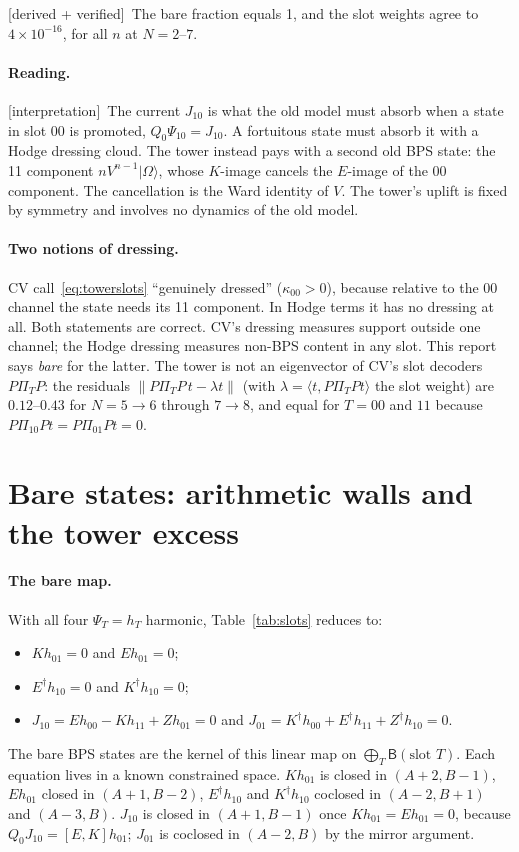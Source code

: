 \documentclass[11pt]{article}
\newcommand{\ip}[2]{\langle #1,#2\rangle}
\newcommand{\B}{\mathsf B}
\newcommand{\Om}{|\Omega\rangle}
\newcommand{\tagbox}[2]{\textsf{\small\color{#1}[#2]}}
\newcommand{\VER}{\tagbox{cder}{derived + verified}}
\newcommand{\INTERP}{\tagbox{cconj}{interpretation}}
\theoremstyle{plain}
\theoremstyle{remark}
\numberwithin{equation}{section}
\begin{document}
\VER\ The bare fraction equals 1, and the slot weights agree to $4\times10^{-16}$, for all $n$ at $N=2$--$7$.

\paragraph{Reading.} \INTERP\ The current $J_{10}$ is what the old model must absorb when a state in slot 00 is
promoted, $Q_0\Psi_{10}=J_{10}$. A fortuitous state must absorb it with a Hodge dressing cloud. The tower instead pays
with a second old BPS state: the 11 component $nV^{n-1}\Om$, whose $K$-image cancels the $E$-image of the 00 component.
The cancellation is the Ward identity of $V$. The tower's uplift is fixed by symmetry and involves no dynamics of the old
model.

\paragraph{Two notions of dressing.} CV call~\eqref{eq:towerslots} ``genuinely dressed'' ($\kappa_{00}>0$), because
relative to the 00 channel the state needs its 11 component. In Hodge terms it has no dressing at all. Both statements are
correct. CV's dressing measures support outside one channel; the Hodge dressing measures non-BPS content in any slot.
This report says \emph{bare} for the latter. The tower is not an eigenvector of CV's slot decoders $P\Pi_TP$: the
residuals $\|P\Pi_TP\,t-\lambda t\|$ (with $\lambda=\ip{t}{P\Pi_TPt}$ the slot weight) are $0.12$--$0.43$ for
$N=5\to6$ through $7\to8$, and equal for $T=00$ and $11$ because $P\Pi_{10}Pt=P\Pi_{01}Pt=0$.

\section{Bare states: arithmetic walls and the tower excess}\label{sec:bare}

\paragraph{The bare map.} With all four $\Psi_T=h_T$ harmonic, Table~\ref{tab:slots} reduces to:
\begin{itemize}\itemsep2pt
\item $Kh_{01}=0$ and $Eh_{01}=0$;
\item $E^\dagger h_{10}=0$ and $K^\dagger h_{10}=0$;
\item $J_{10}=Eh_{00}-Kh_{11}+Zh_{01}=0$ and $J_{01}=K^\dagger h_{00}+E^\dagger h_{11}+Z^\dagger h_{10}=0$.
\end{itemize}
The bare BPS states are the kernel of this linear map on $\bigoplus_T\B(\text{slot }T)$. Each equation lives in a known
constrained space. $Kh_{01}$ is closed in $(A+2,B-1)$, $Eh_{01}$ closed in $(A+1,B-2)$, $E^\dagger h_{10}$ and
$K^\dagger h_{10}$ coclosed in $(A-2,B+1)$ and $(A-3,B)$. $J_{10}$ is closed in $(A+1,B-1)$ once $Kh_{01}=Eh_{01}=0$,
because $Q_0J_{10}=[E,K]h_{01}$; $J_{01}$ is coclosed in $(A-2,B)$ by the mirror argument.
\end{document}
